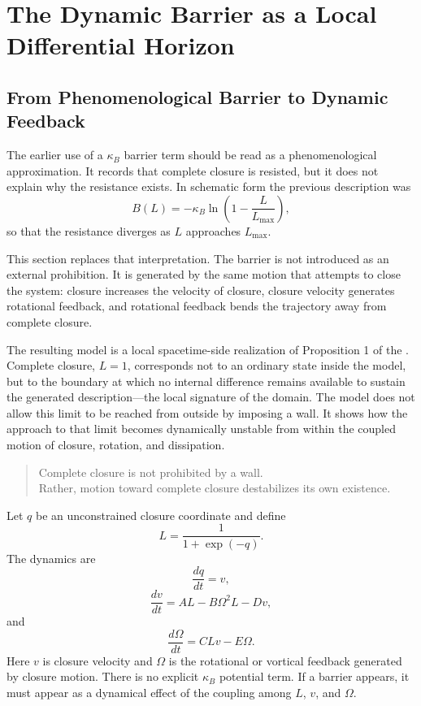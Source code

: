 \section{The Dynamic Barrier as a Local Differential Horizon}
\label{sec:dynamic_barrier}

\subsection{From Phenomenological Barrier to Dynamic Feedback}

The earlier use of a $\kappa_B$ barrier term should be read as a
phenomenological approximation.
It records that complete closure is resisted,
but it does not explain why the resistance exists.
In schematic form the previous description was
\begin{equation}
  B(L)=-\kappa_B\ln\left(1-\frac{L}{L_{\max}}\right),
\end{equation}
so that the resistance diverges as $L$ approaches $L_{\max}$.

This section replaces that interpretation.
The barrier is not introduced as an external prohibition.
It is generated by the same motion that attempts to close the system:
closure increases the velocity of closure,
closure velocity generates rotational feedback,
and rotational feedback bends the trajectory away from complete
closure.

The resulting model is a local spacetime-side realization of
Proposition 1 of the \DHP{}.
Complete closure, $L=1$, corresponds not to an ordinary state inside
the model,
but to the boundary at which no internal difference remains available
to sustain the generated description---the local signature of the
\ungenerated{} domain.
The model does not allow this limit to be reached from outside
by imposing a wall.
It shows how the approach to that limit becomes dynamically unstable
from within the coupled motion of closure, rotation, and dissipation.

\medskip
\begin{quote}
Complete closure is not prohibited by a wall.\\
Rather, motion toward complete closure destabilizes its own existence.
\end{quote}
\medskip

Let $q$ be an unconstrained closure coordinate and define
\begin{equation}
  L=\frac{1}{1+\exp(-q)} .
\end{equation}
The dynamics are
\begin{equation}
  \frac{dq}{dt}=v ,
\end{equation}
\begin{equation}
  \frac{dv}{dt}
  =
  AL
  -
  B\Omega^2L
  -
  Dv ,
\end{equation}
and
\begin{equation}
  \frac{d\Omega}{dt}
  =
  CLv
  -
  E\Omega .
\end{equation}
Here $v$ is closure velocity and $\Omega$ is the rotational or
vortical feedback generated by closure motion.
There is no explicit $\kappa_B$ potential term.
If a barrier appears, it must appear as a dynamical effect of the
coupling among $L$, $v$, and $\Omega$.

